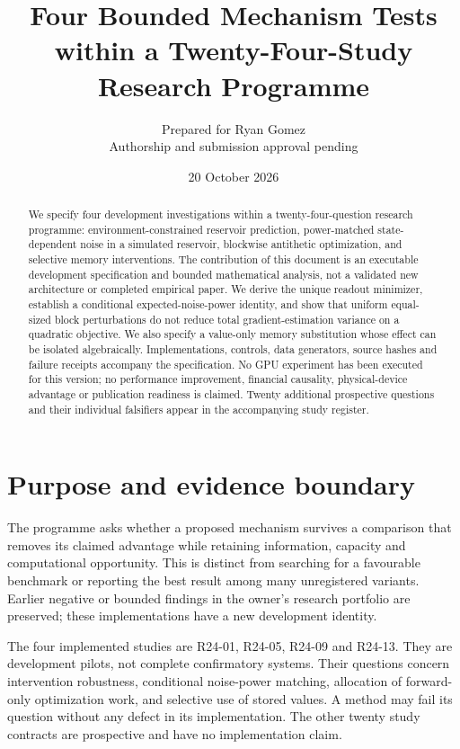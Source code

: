 \documentclass[10pt]{article}
\title{Four Bounded Mechanism Tests within a Twenty-Four-Study Research Programme}
\author{Prepared for Ryan Gomez\\Authorship and submission approval pending}
\date{20 October 2026}
\begin{document}
\maketitle
\begin{abstract}
We specify four development investigations within a twenty-four-question research programme: environment-constrained reservoir prediction, power-matched state-dependent noise in a simulated reservoir, blockwise antithetic optimization, and selective memory interventions. The contribution of this document is an executable development specification and bounded mathematical analysis, not a validated new architecture or completed empirical paper. We derive the unique readout minimizer, establish a conditional expected-noise-power identity, and show that uniform equal-sized block perturbations do not reduce total gradient-estimation variance on a quadratic objective. We also specify a value-only memory substitution whose effect can be isolated algebraically. Implementations, controls, data generators, source hashes and failure receipts accompany the specification. No GPU experiment has been executed for this version; no performance improvement, financial causality, physical-device advantage or publication readiness is claimed. Twenty additional prospective questions and their individual falsifiers appear in the accompanying study register.
\end{abstract}

\section{Purpose and evidence boundary}
The programme asks whether a proposed mechanism survives a comparison that removes its claimed advantage while retaining information, capacity and computational opportunity. This is distinct from searching for a favourable benchmark or reporting the best result among many unregistered variants. Earlier negative or bounded findings in the owner's research portfolio are preserved; these implementations have a new development identity.

The four implemented studies are R24-01, R24-05, R24-09 and R24-13. They are development pilots, not complete confirmatory systems. Their questions concern intervention robustness, conditional noise-power matching, allocation of forward-only optimization work, and selective use of stored values. A method may fail its question without any defect in its implementation. The other twenty study contracts are prospective and have no implementation claim.
\end{document}
